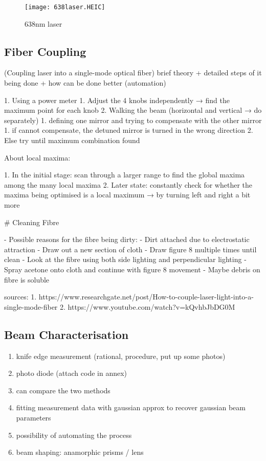 \documentclass[11pt,A4Paper]{article}
\begin{document}
\begin{figure}[H]
    \centering
    \texttt{[image: 638laser.HEIC]}
    \caption{638nm laser}
    \label{fig:638laser}
\end{figure}

\subsection{Fiber Coupling}
(Coupling laser into a single-mode optical fiber) 
brief theory + detailed steps of it being done + how can be done better (automation) 
    
1. Using a power meter 
    1. Adjust the 4 knobs independently → find the maximum point for each knob
    2. Walking the beam (horizontal and vertical → do separately)
        1. defining one mirror and trying to compensate with the other mirror 
            1. if cannot compensate, the detuned mirror is turned in the wrong direction
            2. Else try until maximum combination found

About local maxima: 

1. In the initial stage: scan through a larger range to find the global maxima among the many local maxima 
2. Later state: constantly check for whether the maxima being optimised is a local maximum → by turning left and right a bit more

# Cleaning Fibre

- Possible reasons for the fibre being dirty:
    - Dirt attached due to electrostatic attraction
- Draw out a new section of cloth
- Draw figure 8 multiple times until clean
- Look at the fibre using both side lighting and perpendicular lighting
- Spray acetone onto cloth and continue with figure 8 movement
    - Maybe debris on fibre is soluble

sources: 
1. https://www.researchgate.net/post/How-to-couple-laser-light-into-a-single-mode-fiber
2. https://www.youtube.com/watch?v=kQvhbJbDG0M


\subsection{Beam Characterisation}
\begin{enumerate}
    \item knife edge measurement (rational, procedure, put up some photos)
    \item photo diode (attach code in annex)
    \item can compare the two methods
    \item fitting measurement data with gaussian approx to recover gaussian beam parameters 
    \item possibility of automating the process
    \item beam shaping: anamorphic prisms / lens
\end{enumerate}
\end{document}
